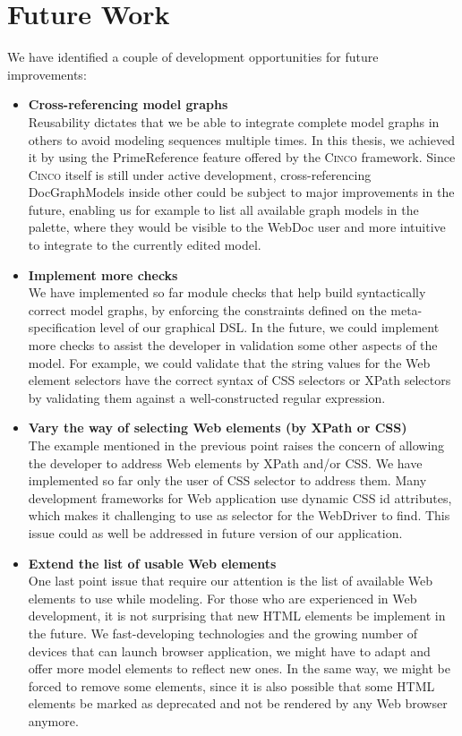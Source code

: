 \chapter{Future Work}\label{ch:futwork}

We have identified a couple of development opportunities for future improvements:
\begin{itemize}
    \item \textbf{Cross-referencing model graphs}\\
        Reusability dictates that we be able to integrate complete model graphs in others to avoid modeling sequences multiple times. In this thesis, we achieved it by using the PrimeReference feature offered by the \textsc{Cinco} framework. Since \textsc{Cinco} itself is still under active development, cross-referencing DocGraphModels inside other could be subject to major improvements in the future, enabling us for example to list all available graph models in the palette, where they would be visible to the WebDoc user and more intuitive to integrate to the currently edited model.
    \item \textbf{Implement more checks}\\
        We have implemented so far module checks that help build syntactically correct model graphs, by enforcing the constraints defined on the meta-specification level of our graphical DSL. In the future, we could implement more checks to assist the developer in validation some other aspects of the model. For example, we could validate that the string values for the Web element selectors have the correct syntax of CSS selectors or XPath selectors by validating them against a well-constructed regular expression.
    \item \textbf{Vary the way of selecting Web elements (by XPath or CSS)}\\
        The example mentioned in the previous point raises the concern of allowing the developer to address Web elements by XPath and/or CSS. We have implemented so far only the user of CSS selector to address them. Many development frameworks for Web application use dynamic CSS id attributes, which makes it challenging to use as selector for the WebDriver to find. This issue could as well be addressed in future version of our application.
    \item \textbf{Extend the list of usable Web elements}\\
        One last point issue that require our attention is the list of available Web elements to use while modeling. For those who are experienced in Web development, it is not surprising that new HTML elements be implement in the future. We fast-developing technologies and the growing number of devices that can launch browser application, we might have to adapt and offer more model elements to reflect new ones. In the same way, we might be forced to remove some elements, since it is also possible that some HTML elements be marked as deprecated and not be rendered by any Web browser anymore.


\end{itemize}
